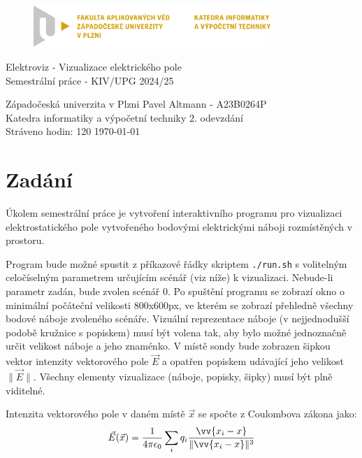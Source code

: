 \documentclass[12pt,a4paper]{article}
\newcommand{\code}[1]{\texttt{#1}}
\begin{document}
\begin{figure}[H]
	\centering
	\includegraphics[width=0.8\textwidth]{pic/kiv-cmyk-cz}
\end{figure}

\begin{center}
	\vspace{.5cm}
	\LARGE{Elektroviz - Vizualizace elektrického pole}\\
	\large{Semestrální práce - KIV/UPG 2024/25}
\end{center}

\vfill

\noindent
Západočeská univerzita v Plzni \hfill Pavel Altmann - A23B0264P\\
Katedra informatiky a výpočetní techniky \hfill 2. odevzdání\\
Stráveno hodin: 120 \hfill \today
\thispagestyle{empty}

\newpage
\setcounter{page}{1}

\tableofcontents

\newpage

\section{Zadání}

Úkolem semestrální práce je vytvoření interaktivního programu pro vizualizaci
elektrostatického pole vytvořeného bodovými elektrickými náboji rozmístěných v
prostoru.

Program bude možné spustit z příkazové řádky skriptem \code{./run.sh} s
volitelným celočíselným parametrem určujícím scénář (viz níže) k vizualizaci.
Nebude-li parametr zadán, bude zvolen scénář 0. Po spuštění programu se zobrazí
okno o minimální počáteční velikosti 800x600px, ve kterém se zobrazí přehledně
všechny bodové náboje zvoleného scénáře. Vizuální reprezentace náboje (v
nejjednodušší podobě kružnice s popiskem) musí být volena tak, aby bylo možné
jednoznačně určit velikost náboje a jeho znaménko. V místě sondy bude zobrazen
šipkou vektor intenzity vektorového pole $\vec{E}$ a opatřen popiskem udávající
jeho velikost $\|\vec{E}\|$. Všechny elementy vizualizace (náboje, popisky,
šipky) musí být plně viditelné.

Intenzita vektorového pole v daném místě $\vec{x}$ se spočte
z Coulombova zákona jako:
\[ \vec{E}(\vec{x}) = \frac{1}{4 \pi \epsilon_0}
\sum_i q_i \frac{\vv{x_i - x}}{\|\vv{x_i - x}\|^3} \]
\end{document}
